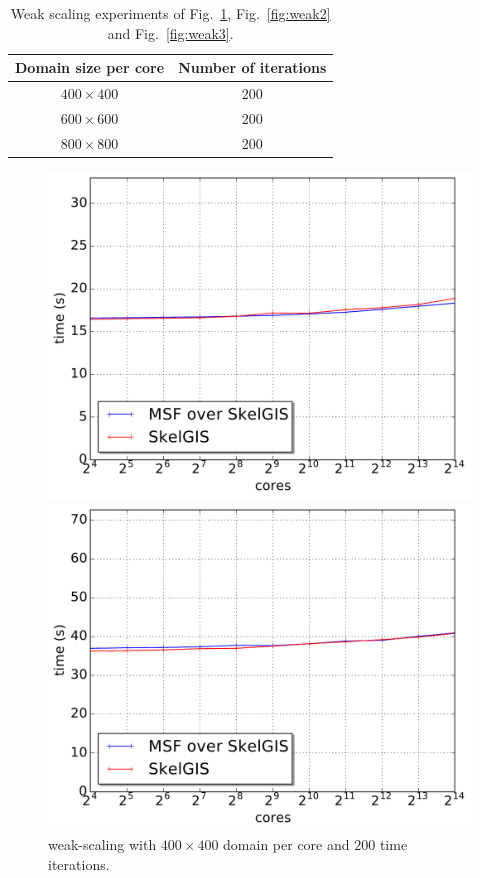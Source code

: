 \begin{table}[!ht]
\begin{center}
 \begin{tabular}{|c|c|}
    Domain size per core & Number of iterations\\
    \hline
     $400 \times 400$ & $200$\\
     $600 \times 600$ & $200$\\
     $800 \times 800$ & $200$\\
 \end{tabular}
 \caption{\label{tab:weak}Weak scaling experiments of Fig.~\ref{fig:weak1}, Fig.~\ref{fig:weak2} and Fig.~\ref{fig:weak3}.}
 \end{center}
\end{table}

\begin{figure}[t]
\begin{minipage}{.475\textwidth}
  \includegraphics[width=\textwidth]{../results/weak_scaling/400_200/median_weak.pdf}
  \caption{weak-scaling with $400 \times 400$ domain per core and $200$ time iterations.}
  \label{fig:weak1}
\end{minipage}
\hfill
\begin{minipage}{.475\textwidth}
  \includegraphics[width=\textwidth]{../results/weak_scaling/600_200/median_weak.pdf}

\end{minipage}
\end{figure}
